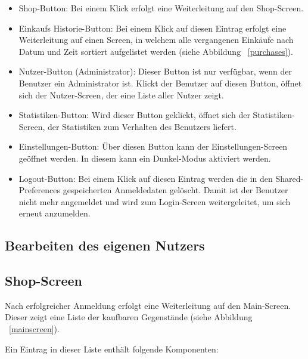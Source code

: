 \begin{itemize}
	\item Shop-Button: Bei einem Klick erfolgt eine Weiterleitung auf den Shop-Screen.

	\item Einkaufs Historie-Button: Bei einem Klick auf diesen Eintrag erfolgt eine Weiterleitung auf einen Screen, in welchem alle vergangenen Einkäufe nach Datum und Zeit sortiert aufgelistet werden (siehe Abbildung ~\ref{purchases}).

	\item Nutzer-Button (Administrator): Dieser Button ist nur verfügbar, wenn der Benutzer ein Administrator ist.
	Klickt der Benutzer auf diesen Button, öffnet sich der Nutzer-Screen, der eine Liste aller Nutzer zeigt.

	\item Statistiken-Button: Wird dieser Button geklickt, öffnet sich der Statistiken-Screen, der Statistiken zum Verhalten des Benutzers liefert.

	\item Einstellungen-Button: Über diesen Button kann der Einstellungen-Screen geöffnet werden.
	In diesem kann ein Dunkel-Modus aktiviert werden.

	\item Logout-Button: Bei einem Klick auf diesen Eintrag werden die in den Shared-Preferences gespeicherten Anmeldedaten gelöscht.
	Damit ist der Benutzer nicht mehr angemeldet und wird zum Login-Screen weitergeleitet, um sich erneut anzumelden.
\end{itemize}

\subsection{Bearbeiten des eigenen Nutzers} \label{subsec:edit-user}

\subsection{Shop-Screen}\label{subsec:shop-screen}

Nach erfolgreicher Anmeldung erfolgt eine Weiterleitung auf den Main-Screen.
Dieser zeigt eine Liste der kaufbaren Gegenstände (siehe Abbildung ~\ref{mainscreen}).


Ein Eintrag in dieser Liste enthält folgende Komponenten:

